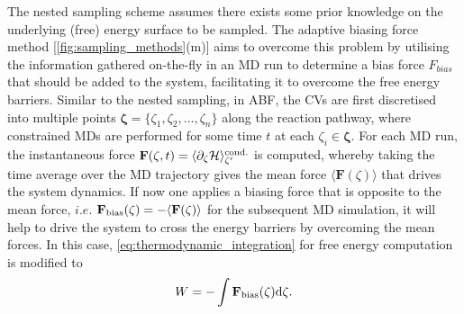 The nested sampling scheme assumes there exists some prior knowledge on the underlying (free) energy surface to be sampled. The adaptive biasing force method [\cref{fig:sampling_methods}(m)]\cite{darve2008adaptive,rodriguez2004assessing,darve2008adaptive} aims to overcome this problem by utilising the information gathered on-the-fly in an MD run to determine a bias force $F_{bias}$ that should be added to the system, facilitating it to overcome the free energy barriers. Similar to the nested sampling, in ABF, the CVs are first discretised into multiple points $\bm{\zeta}=\{\zeta_1,\zeta_2,\ldots,\zeta_n \}$ along the reaction pathway, where constrained MDs are performed for some time $t$ at each $\zeta_i\in\bm{\zeta}$. For each MD run, the instantaneous force $\mathbf{F}(\zeta,t)=\langle \partial_{\zeta}\mathcal{H}\rangle_{\zeta^\prime}^{\mbox{\scriptsize{cond.}}}$ is computed, whereby taking the time average over the MD trajectory gives the mean force $\langle \bm{F}(\zeta)\rangle$ that drives the system dynamics. If now one applies a biasing force that is opposite to the mean force, $i.e.$ $\mathbf{F}_{\mbox{\scriptsize{bias}}}(\zeta)=-\langle \mathbf{F}(\zeta)\rangle$ for the subsequent MD simulation, it will help to drive the system to cross the energy barriers by overcoming the mean forces. In this case, \cref{eq:thermodynamic_integration} for free energy computation is modified to 
\begin{equation*}
    W=-\int \mathbf{F}_{\mbox{\scriptsize{bias}}}(\zeta)\mbox{d}\zeta.
\end{equation*}